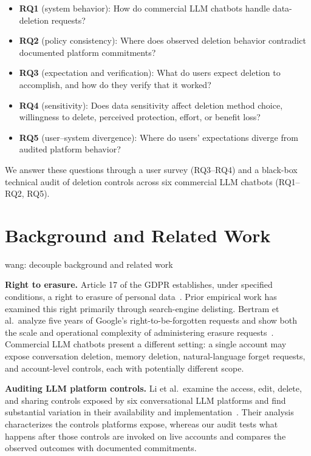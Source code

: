 \documentclass[conference,compsoc]{IEEEtran}
\newcommand{\xw}[1] {{\color{red}wang: #1}}
\begin{document}
\begin{itemize}[leftmargin=*]
\item[] \textbf{RQ1} (system behavior): How do commercial LLM chatbots
handle data-deletion requests?
\item[] \textbf{RQ2} (policy consistency): Where does observed deletion
behavior contradict documented platform commitments?
\item[] \textbf{RQ3} (expectation and verification): What do users expect
deletion to accomplish, and how do they verify that it worked?
\item[] \textbf{RQ4} (sensitivity): Does data sensitivity affect deletion
method choice, willingness to delete, perceived protection, effort, or
benefit loss?
\item[] \textbf{RQ5} (user--system divergence): Where do users'
expectations diverge from audited platform behavior?
\end{itemize}

We answer these questions through a user survey (RQ3--RQ4) and a
black-box technical audit of deletion controls across six commercial LLM
chatbots (RQ1--RQ2, RQ5).


\section{Background and Related Work}
\label{sec:background}

\xw{decouple background and related work}

\textbf{Right to erasure.} Article 17 of the GDPR establishes, under
specified conditions, a right to erasure of personal data~\cite{gdpr2016}.
Prior empirical work has examined this right primarily through search-engine
delisting. Bertram et al.\ analyze five years of Google's right-to-be-forgotten
requests and show both the scale and operational complexity of administering
erasure requests~\cite{bertram2019five}. Commercial LLM chatbots present a
different setting: a single account may expose conversation deletion, memory
deletion, natural-language forget requests, and account-level controls, each
with potentially different scope.

\textbf{Auditing LLM platform controls.} Li et al.\ examine the
access, edit, delete, and sharing controls exposed by six conversational LLM
platforms and find substantial variation in their availability and
implementation~\cite{li2026privacy}. Their analysis characterizes the controls
platforms expose, whereas our audit tests what happens after those controls
are invoked on live accounts and compares the observed outcomes with
documented commitments.
\end{document}
